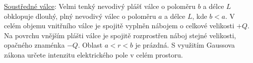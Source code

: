 \begin{mdframed}[style=mdexam]
  \begin{example}\label{fyz:fey_exam001}
    \href{http://librarian/stable.php?id=380}{Soustředné válce}: Velmi tenký nevodivý plášť válce o
    poloměru \(b\) a délce \(L\) obklopuje dlouhý, plný nevodivý válec o poloměru \(a\) a délce
    \(L\), kde \(b < a\). V celém objemu vnitřního válce je spojitě vyplněn nábojem o celkové
    velikosti \(+Q\). Na povrchu vnějším plášti válce je spojitě rozprostřen náboj stejné velikosti,
    opačného znaménka \(−Q\). Oblast \(a < r < b\) je prázdná. S využitím Gaussova zákona určete
    intenzitu elektrického pole v celém prostoru.
      
    {\centering
    \captionsetup{type=figure}
    \par}
    

\end{example}
\end{mdframed}
